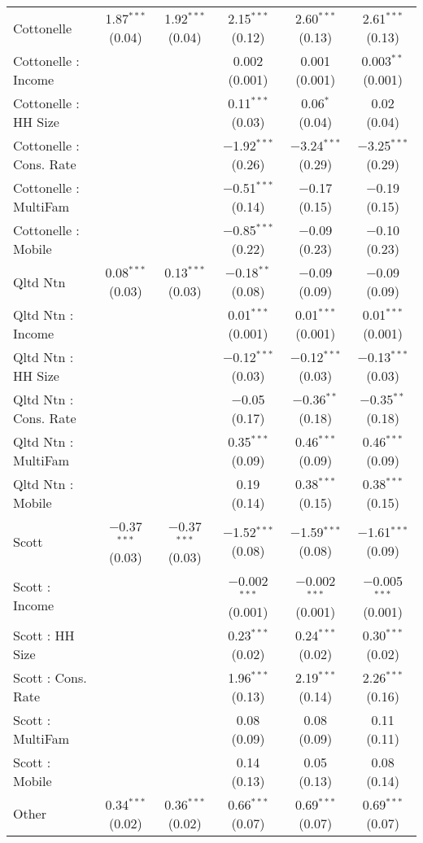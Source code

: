 \begin{table}[!htbp]
\begin{tabular}{@{\extracolsep{5pt}}lccccc}
  Cottonelle & 1.87$^{***}$ (0.04) & 1.92$^{***}$ (0.04) & 2.15$^{***}$ (0.12) & 2.60$^{***}$ (0.13) & 2.61$^{***}$ (0.13) \\ 
  Cottonelle : Income &  &  & 0.002 (0.001) & 0.001 (0.001) & 0.003$^{**}$ (0.001) \\ 
  Cottonelle : HH Size &  &  & 0.11$^{***}$ (0.03) & 0.06$^{*}$ (0.04) & 0.02 (0.04) \\ 
  Cottonelle : Cons. Rate &  &  & $-$1.92$^{***}$ (0.26) & $-$3.24$^{***}$ (0.29) & $-$3.25$^{***}$ (0.29) \\ 
  Cottonelle : MultiFam &  &  & $-$0.51$^{***}$ (0.14) & $-$0.17 (0.15) & $-$0.19 (0.15) \\ 
  Cottonelle : Mobile &  &  & $-$0.85$^{***}$ (0.22) & $-$0.09 (0.23) & $-$0.10 (0.23) \\ 
  Qltd Ntn & 0.08$^{***}$ (0.03) & 0.13$^{***}$ (0.03) & $-$0.18$^{**}$ (0.08) & $-$0.09 (0.09) & $-$0.09 (0.09) \\ 
  Qltd Ntn : Income &  &  & 0.01$^{***}$ (0.001) & 0.01$^{***}$ (0.001) & 0.01$^{***}$ (0.001) \\ 
  Qltd Ntn : HH Size &  &  & $-$0.12$^{***}$ (0.03) & $-$0.12$^{***}$ (0.03) & $-$0.13$^{***}$ (0.03) \\ 
  Qltd Ntn : Cons. Rate &  &  & $-$0.05 (0.17) & $-$0.36$^{**}$ (0.18) & $-$0.35$^{**}$ (0.18) \\ 
  Qltd Ntn : MultiFam &  &  & 0.35$^{***}$ (0.09) & 0.46$^{***}$ (0.09) & 0.46$^{***}$ (0.09) \\ 
  Qltd Ntn : Mobile &  &  & 0.19 (0.14) & 0.38$^{***}$ (0.15) & 0.38$^{***}$ (0.15) \\ 
  Scott & $-$0.37$^{***}$ (0.03) & $-$0.37$^{***}$ (0.03) & $-$1.52$^{***}$ (0.08) & $-$1.59$^{***}$ (0.08) & $-$1.61$^{***}$ (0.09) \\ 
  Scott : Income &  &  & $-$0.002$^{***}$ (0.001) & $-$0.002$^{***}$ (0.001) & $-$0.005$^{***}$ (0.001) \\ 
  Scott : HH Size &  &  & 0.23$^{***}$ (0.02) & 0.24$^{***}$ (0.02) & 0.30$^{***}$ (0.02) \\ 
  Scott : Cons. Rate &  &  & 1.96$^{***}$ (0.13) & 2.19$^{***}$ (0.14) & 2.26$^{***}$ (0.16) \\ 
  Scott : MultiFam &  &  & 0.08 (0.09) & 0.08 (0.09) & 0.11 (0.11) \\ 
  Scott : Mobile &  &  & 0.14 (0.13) & 0.05 (0.13) & 0.08 (0.14) \\ 
  Other & 0.34$^{***}$ (0.02) & 0.36$^{***}$ (0.02) & 0.66$^{***}$ (0.07) & 0.69$^{***}$ (0.07) & 0.69$^{***}$ (0.07) \\ 

\end{tabular}
\end{table}
